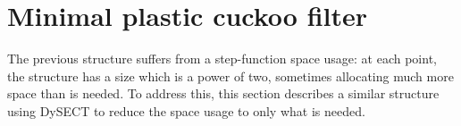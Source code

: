 \documentclass[letterpaper, 11pt]{article}
\newcommand{\ints}{\mathbb{Z}}
\begin{document}










\section{Minimal plastic cuckoo filter}
\label{mpcf}

The previous structure suffers from a step-function space usage:
at each point, the structure has a size which is a power of two, sometimes allocating much more space than is needed.
To address this, this section describes a similar structure using DySECT to reduce the space usage to only what is needed.
\end{document}
